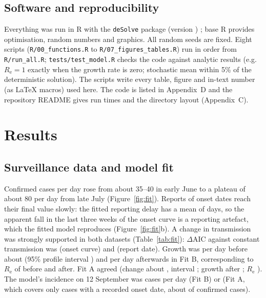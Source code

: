 \documentclass[11pt,a4paper]{article}
\newcommand{\Rt}{R_{\mathrm{e}}}
\begin{document}
\subsection{Software and reproducibility}
Everything was run in R \rVersion{} with the \texttt{deSolve} package (version \desolveVersion) \citep{rcore,desolve2010}; base R provides optimisation, random numbers and graphics. All random seeds are fixed. Eight scripts (\texttt{R/00\_functions.R} to \texttt{R/07\_figures\_tables.R}) run in order from \texttt{R/run\_all.R}; \texttt{tests/test\_model.R} checks the code against analytic results (e.g.\ $\Rt=1$ exactly when the growth rate is zero; stochastic mean within 5\% of the deterministic solution). The scripts write every table, figure and in-text number (as \LaTeX{} macros) used here. The code is listed in Appendix~D and the repository README gives run times and the directory layout (Appendix~C).

\section{Results}
\subsection{Surveillance data and model fit}
Confirmed cases per day rose from about 35--40 in early June to a plateau of about 80 per day from late July (Figure~\ref{fig:fit}). Reports of onset dates reach their final value slowly: the fitted reporting delay has a mean of \delayMean{} days, so the apparent fall in the last three weeks of the onset curve is a reporting artefact, which the fitted model reproduces (Figure~\ref{fig:fit}b). A change in transmission was strongly supported in both datasets (Table~\ref{tab:fit}): $\Delta$AIC against constant transmission was \fitAdAIC{} (onset curve) and \fitBdAIC{} (report date). Growth was \fitBrBefore{} per day before about \fitBtc{} (95\% profile interval \fitBtcRange) and \fitBrAfter{} per day afterwards in Fit B, corresponding to $\Rt$ of \fitBReBefore{} before and \fitBReAfter{} after. Fit A agreed (change about \fitAtc, interval \fitAtcRange; growth after \fitArAfter; $\Rt$ \fitAReAfter). The model's incidence on 12 September was \fitBincEnd{} cases per day (Fit B) or \fitAincEnd{} (Fit A, which covers only cases with a recorded onset date, about \shareOnset{} of confirmed cases).
\end{document}
